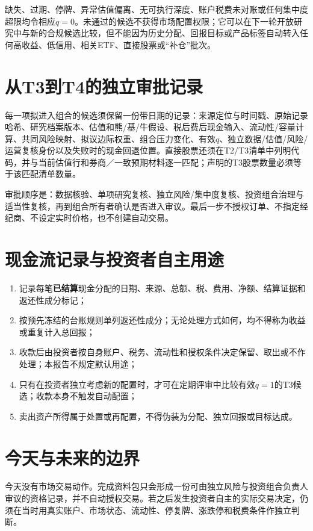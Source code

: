 缺失、过期、停牌、异常估值偏离、无可执行深度、账户税费未对账或任何集中度超限均令相应$q=0$。未通过的候选不获得市场配置权限；它可以在下一轮开放研究中与新的合规候选比较，但不能因为历史分配、回报目标或产品标签自动转入任何高收益、低信用、相关ETF、直接股票或“补仓”批次。

\section{从T3到T4的独立审批记录}

每一项拟进入组合的候选须保留一份带日期的记录：来源定位与时间戳、原始记录哈希、研究档案版本、估值和熊/基/牛假设、税后费后现金输入、流动性/容量计算、共同风险映射、拟议边际权重、组合压力变化、有效$q$、独立数据/估值/风险/运营复核身份以及失败时的现金回退位置。直接股票还须在T2/T3清单中列明代码，并与当前估值行和券商／一致预期材料逐一匹配；声明的T3股票数量必须等于该匹配清单数量。

审批顺序是：数据核验、单项研究复核、独立风险/集中度复核、投资组合治理与适当性复核，再到组合所有者确认是否进入审议。最后一步不授权订单、不指定经纪商、不设定实时价格，也不创建自动交易。

\section{现金流记录与投资者自主用途}

\begin{enumerate}
  \item 记录每笔\textbf{已结算}现金分配的日期、来源、总额、税、费用、净额、结算证据和返还性成分标记；
  \item 按预先冻结的台账规则单列返还性成分；无论处理方式如何，均不得称为收益或重复计入总回报；
  \item 收款后由投资者按自身账户、税务、流动性和授权条件决定保留、取出或不作处理；本报告不规定默认用途；
  \item 只有在投资者独立考虑新的配置时，才可在定期评审中比较有效$q=1$的T3候选；收款本身不触发自动配置；
  \item 卖出资产所得属于处置或再配置，不得伪装为分配、独立回报或目标达成。
\end{enumerate}

\section{今天与未来的边界}

今天没有市场交易动作。完成资料包只会形成一份可由独立风险与投资组合负责人审议的资格记录，并不自动授权交易。若之后发生投资者自主的实际交易决定，仍须在当时用真实账户、市场状态、流动性、停复牌、涨跌停和税费条件作独立判断。
